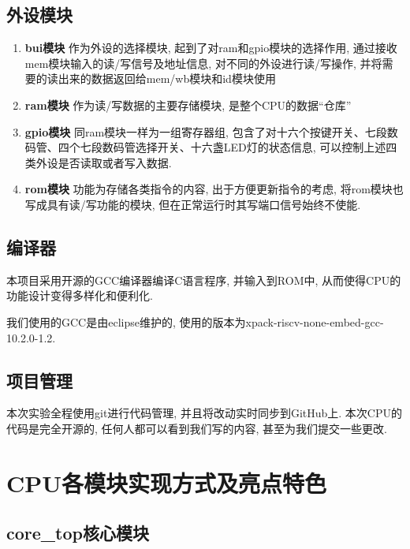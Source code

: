 \documentclass[lang=cn,11pt,a4paper,chinesefont=founder]{elegantpaper}
\begin{document}
\subsection{外设模块}
\begin{enumerate}
    \item \textbf{bui模块}
          作为外设的选择模块, 起到了对ram和gpio模块的选择作用, 通过接收mem模块输入的读/写信号及地址信息, 对不同的外设进行读/写操作, 并将需要的读出来的数据返回给mem/wb模块和id模块使用
    \item \textbf{ram模块}
          作为读/写数据的主要存储模块, 是整个CPU的数据“仓库”
    \item \textbf{gpio模块} 同ram模块一样为一组寄存器组, 包含了对十六个按键开关、七段数码管、四个七段数码管选择开关、十六盏LED灯的状态信息, 可以控制上述四类外设是否读取或者写入数据. 
    \item \textbf{rom模块}
          功能为存储各类指令的内容, 出于方便更新指令的考虑, 将rom模块也写成具有读/写功能的模块, 但在正常运行时其写端口信号始终不使能. 
\end{enumerate}
\subsection{编译器}
本项目采用开源的GCC编译器编译C语言程序, 并输入到ROM中, 从而使得CPU的功能设计变得多样化和便利化. 

我们使用的GCC是由eclipse维护的, 使用的版本为xpack-riscv-none-embed-gcc-10.2.0-1.2. 

\subsection{项目管理}

本次实验全程使用git进行代码管理, 并且将改动实时同步到GitHub上. 本次CPU的代码是完全开源的, 任何人都可以看到我们写的内容, 
甚至为我们提交一些更改. 

\section{CPU各模块实现方式及亮点特色}
\subsection{core\_top核心模块}
\end{document}
